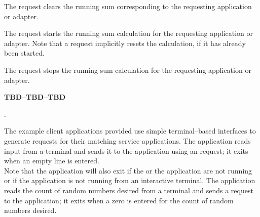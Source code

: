 The  request clears the running sum
corresponding to the requesting application or adapter.\\
%

The  request starts the running sum
calculation for the requesting application or adapter.
Note that a  request implicitly resets the
calculation, if it has already been started.\\
%

The  request stops the running sum
calculation for the requesting application or adapter.
%

			\begin{Large}\textbf{TBD--TBD--TBD}\end{Large}.

\secondaryEnd{}
The example client applications provided use simple terminal--based interfaces to
generate requests for their matching service applications.
The  application reads input from a terminal and
sends it to the  application using an
 request; it exits when an empty line is
entered.\\

Note that the application will also exit if the
 or the
 application are not running or if the application
is not running from an interactive terminal.
The  application reads the count of
random numbers desired from a terminal and sends a
 request to the
 application; it exits when a zero is
entered for the count of random numbers desired.\\

